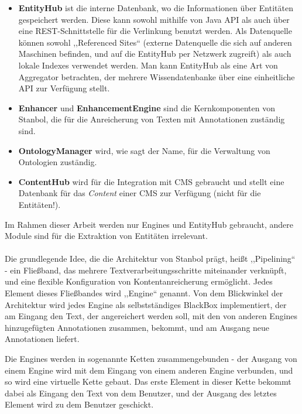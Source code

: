 \begin{itemize}
\item \textbf{EntityHub} ist die interne Datenbank, wo die Informationen über Entitäten gespeichert werden. Diese kann sowohl mithilfe von Java API als auch über eine REST-Schnittstelle für die Verlinkung benutzt werden. Als Datenquelle können sowohl ,,Referenced Sites`` (externe Datenquelle die sich auf anderen Maschinen befinden, und auf die EntityHub per Netzwerk zugreift) als auch lokale Indexes verwendet werden. Man kann EntityHub als eine Art von Aggregator betrachten, der mehrere Wissendatenbanke über eine einheitliche API zur Verfügung stellt. 
\item \textbf{Enhancer} und \textbf{EnhancementEngine} sind die Kernkomponenten von Stanbol, die für die Anreicherung von Texten mit Annotationen zuständig sind.
\item \textbf{OntologyManager} wird, wie sagt der Name, für die Verwaltung von Ontologien zuständig.
\item \textbf{ContentHub} wird für die Integration mit CMS gebraucht und stellt eine Datenbank für das \textit{Content} einer CMS zur Verfügung (nicht für die Entitäten!).
\end{itemize}
Im Rahmen dieser Arbeit werden nur Engines und EntityHub gebraucht, andere Module sind für die Extraktion von Entitäten irrelevant.

\paragraph{}
Die grundlegende Idee, die die Architektur von Stanbol prägt, heißt ,,Pipelining`` - ein Fließband, das mehrere Textverarbeitungsschritte miteinander verknüpft, und eine flexible Konfiguration von Kontentanreicherung ermöglicht. Jedes Element dieses Fließbandes wird ,,Engine`` genannt. Von dem Blickwinkel der Architektur wird jedes Engine als selbstständiges BlackBox implementiert, der am Eingang den Text, der angereichert werden soll, mit den von anderen Engines hinzugefügten Annotationen zusammen, bekommt, und am Ausgang neue Annotationen liefert. 

Die Engines werden in sogenannte Ketten zusammengebunden - der Ausgang von einem Engine wird mit dem Eingang von einem anderen Engine verbunden, und so wird eine virtuelle Kette gebaut. Das erste Element in dieser Kette bekommt dabei als Eingang den Text von dem Benutzer, und der Ausgang des letztes Element wird zu dem Benutzer geschickt. 


